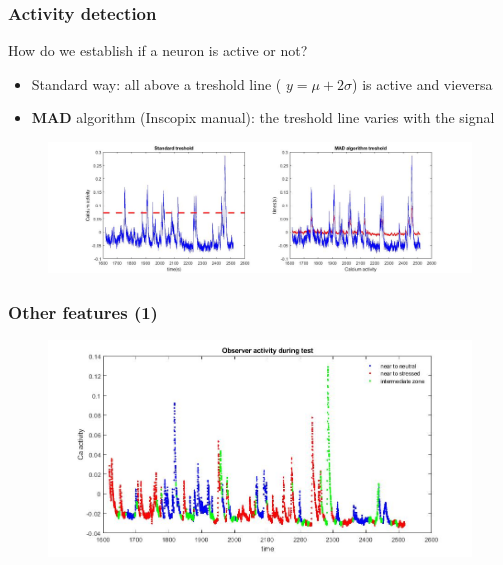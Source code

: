 \documentclass{beamer}
\begin{document}
\begin{frame}
\frametitle{Activity detection}

How do we establish if a neuron is active or not?

\begin{itemize}
	\item Standard way: all above a treshold line ( $ y = \mu + 2\sigma$) is active and vieversa
	
	\item \textbf{MAD} algorithm (Inscopix manual): the treshold line varies with the signal
	
	
	
	
\end{itemize}

\begin{figure}[H]
	\hspace*{-1cm}  
		\includegraphics[scale=.30]{treshold.jpg} 
	 
\end{figure}


\end{frame}	


\begin{frame}
\frametitle{Other features (1)}

	
	


\begin{figure}[H]
	\begin{center}
		\includegraphics[scale=.40]{zone_plot.jpg} 
	\end{center}  
	
	
\end{figure}


\end{frame}	
\end{document}
